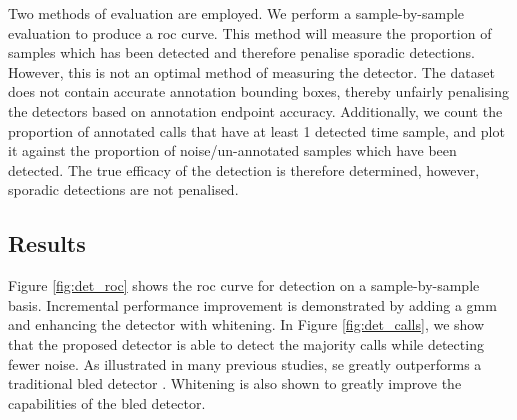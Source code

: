 {Two methods of evaluation are employed. We perform a sample-by-sample evaluation to produce a \ac{roc} curve. This method will measure the proportion of samples which has been detected and therefore penalise sporadic detections. However, this is not an optimal method of measuring the detector. The dataset does not contain accurate annotation bounding boxes, thereby unfairly penalising the detectors based on annotation endpoint accuracy. Additionally, we count the proportion of annotated calls that have at least 1 detected time sample, and plot it against the proportion of noise/un-annotated samples which have been detected. The true efficacy of the detection is therefore determined, however, sporadic detections are not penalised.




\subsection{Results}
\label{sec:detector_results}

Figure \ref{fig:det_roc} shows the \ac{roc} curve for detection on a sample-by-sample basis. Incremental performance improvement is demonstrated by adding a \ac{gmm} and enhancing the detector with whitening. In Figure \ref{fig:det_calls}, we show that the proposed detector is able to detect the majority calls while detecting fewer noise.  As illustrated in many previous studies, \ac{se} greatly outperforms a traditional \ac{bled} detector \citep{entropyJASA}. Whitening is also shown to greatly improve the capabilities of the \ac{bled} detector.




}
